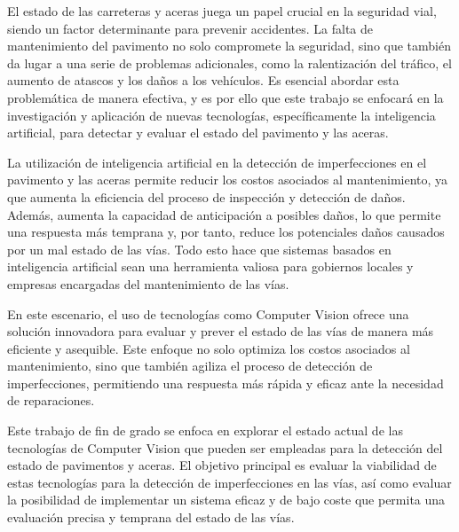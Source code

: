 
El estado de las carreteras y aceras juega un papel crucial en la seguridad vial, siendo un factor determinante para prevenir accidentes. La falta de mantenimiento del pavimento no solo compromete la seguridad, sino que también da lugar a una serie de problemas adicionales, como la ralentización del tráfico, el aumento de atascos y los daños a los vehículos. Es esencial abordar esta problemática de manera efectiva, y es por ello que este trabajo se enfocará en la investigación y aplicación de nuevas tecnologías, específicamente la inteligencia artificial, para detectar y evaluar el estado del pavimento y las aceras.

La utilización de inteligencia artificial en la detección de imperfecciones en el pavimento y las aceras permite reducir los costos asociados al mantenimiento, ya que aumenta la eficiencia del proceso de inspección y detección de daños. Además, aumenta la capacidad de anticipación a posibles daños, lo que permite una respuesta más temprana y, por tanto, reduce los potenciales daños causados por un mal estado de las vías. Todo esto hace que sistemas basados en inteligencia artificial sean una herramienta valiosa para gobiernos locales y empresas encargadas del mantenimiento de las vías.

En este escenario, el uso de tecnologías como Computer Vision ofrece una solución innovadora para evaluar y prever el estado de las vías de manera más eficiente y asequible. Este enfoque no solo optimiza los costos asociados al mantenimiento, sino que también agiliza el proceso de detección de imperfecciones, permitiendo una respuesta más rápida y eficaz ante la necesidad de reparaciones.

Este trabajo de fin de grado se enfoca en explorar el estado actual de las tecnologías de Computer Vision que pueden ser empleadas para la detección del estado de pavimentos y aceras. El objetivo principal es evaluar la viabilidad de estas tecnologías para la detección de imperfecciones en las vías, así como evaluar la posibilidad de implementar un sistema eficaz y de bajo coste que permita una evaluación precisa y temprana del estado de las vías.